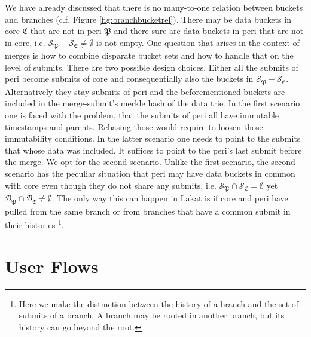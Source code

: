 \documentclass[14pt]{article}
\begin{document}
We have already discussed that there is no many-to-one relation between buckets and branches (c.f. Figure \ref{fig:branchbucketrel}). There may be data buckets in core $\mathfrak C$ that are not in peri $\mathfrak P$ and there sure are data buckets in peri that are not in core, i.e. $\mathcal S_{\mathfrak P}-\mathcal S_{\mathfrak C}\neq \emptyset$ is not empty. 
One question that arises in the context of merges is how to combine disparate bucket sets and how to handle that on the level of submits. There are two possible design choices. Either all the submits of peri become submits of core and consequentially also the buckets in $\mathcal S_{\mathfrak P}-\mathcal S_{\mathfrak C}$. Alternatively they stay submits of peri and the beforementioned buckets are included in the merge-submit's merkle hash of the data trie. In the first scenario one is faced with the problem, that the submits of peri all have immutable timestamps and parents. Rebasing those would require to loosen those immutability conditions. In the latter scenario one needs to point to the submits that whose data was included. It suffices to point to the peri's last submit before the merge. We opt for the second scenario. Unlike the first scenario, the second scenario has the peculiar situation that peri may have data buckets in common with core even though they do not share any submits, i.e. $\mathcal S_{\mathfrak P}\cap\mathcal S_{\mathfrak C}= \emptyset$ yet $\mathcal B_{\mathfrak P}\cap\mathcal B_{\mathfrak C}\neq \emptyset$. The only way this can happen in Lakat is if core and peri have pulled from the same branch or from branches that have a common submit in their histories \footnote{Here we make the distinction between the history of a branch and the set of submits of a branch. A branch may be rooted in another branch, but its history can go beyond the root.}. 

% 
% 
% 
% 
% 
% 



\section{User Flows}
\end{document}
